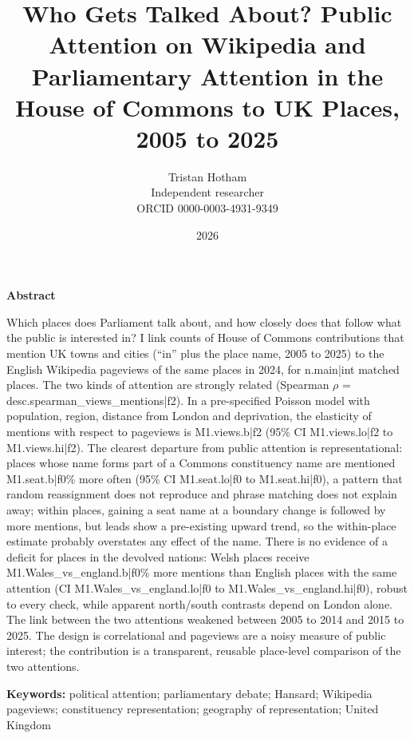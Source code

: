 \documentclass[11pt,a4paper]{article}
\title{\textbf{Who Gets Talked About? Public Attention on Wikipedia and Parliamentary Attention in the House of Commons to UK Places, 2005 to 2025}}
\author{Tristan Hotham\\\small Independent researcher\\\small ORCID 0000-0003-4931-9349}
\date{2026}
\begin{document}
\maketitle
\begin{center}\textbf{Abstract}\end{center}
Which places does Parliament talk about, and how closely does that follow what the public is interested in? I link counts of House of Commons contributions that mention UK towns and cities (``in'' plus the place name, 2005 to 2025) to the English Wikipedia pageviews of the same places in 2024, for {{n.main|int}} matched places. The two kinds of attention are strongly related (Spearman $\rho$ = {{desc.spearman_views_mentions|f2}}). In a pre-specified Poisson model with population, region, distance from London and deprivation, the elasticity of mentions with respect to pageviews is {{M1.views.b|f2}} (95\% CI {{M1.views.lo|f2}} to {{M1.views.hi|f2}}). The clearest departure from public attention is representational: places whose name forms part of a Commons constituency name are mentioned {{M1.seat.b|f0}}\% more often (95\% CI {{M1.seat.lo|f0}} to {{M1.seat.hi|f0}}), a pattern that random reassignment does not reproduce and phrase matching does not explain away; within places, gaining a seat name at a boundary change is followed by more mentions, but leads show a pre-existing upward trend, so the within-place estimate probably overstates any effect of the name. There is no evidence of a deficit for places in the devolved nations: Welsh places receive {{M1.Wales_vs_england.b|f0}}\% more mentions than English places with the same attention (CI {{M1.Wales_vs_england.lo|f0}} to {{M1.Wales_vs_england.hi|f0}}), robust to every check, while apparent north/south contrasts depend on London alone. The link between the two attentions weakened between 2005 to 2014 and 2015 to 2025. The design is correlational and pageviews are a noisy measure of public interest; the contribution is a transparent, reusable place-level comparison of the two attentions.

\medskip\noindent\textbf{Keywords:} political attention; parliamentary debate; Hansard; Wikipedia pageviews; constituency representation; geography of representation; United Kingdom
\end{document}
